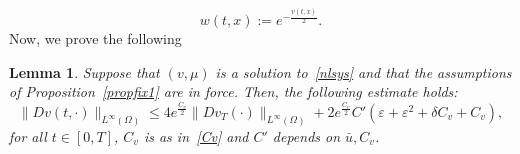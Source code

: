 \documentclass[10pt,a4paper,nouppercase,nowrite]{article}
\numberwithin{equation}{section}
\newcommand{\eps}{\varepsilon}
\newtheorem{lem}[defn]{Lemma}
\theoremstyle{definition}
\begin{document}
	\begin{equation*}
		w(t,x):=e^{-\frac{v(t,x)}{2}}.
	\end{equation*}
	Now, we prove the following
	\begin{lem}	\label{lemDw}
		Suppose that $(v,\mu)$ is a solution to~\eqref{nlsys} and that the assumptions of Proposition~\ref{propfix1} are in force. Then,	the following estimate holds:
		\begin{equation*}
		\|Dv(t,\cdot)\|_{L^{\infty}(\Omega)} \le 4 e^{\frac{C_v}{2}} \| Dv_T(\cdot) \|_{L^{\infty}(\Omega)} + 2 e^{\frac{C_v}{2}} C' \left( \eps + \eps^2 + \delta C_v + C_v \right),
		\end{equation*}
		for all $t \in [0,T]$, $C_v$ is as in~\eqref{Cv} and $C'$ depends on $\bar u, C_v$.
	\end{lem}
\end{document}

